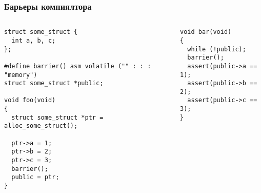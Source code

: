 \begin{frame}[fragile]
\frametitle{Барьеры компиялтора}

\begin{columns}[T]
  \begin{column}{.45\linewidth}
    \begin{lstlisting}
struct some_struct {
  int a, b, c;
};

#define barrier() asm volatile ("" : : : "memory")
struct some_struct *public;

void foo(void)
{
  struct some_struct *ptr = alloc_some_struct();

  ptr->a = 1;
  ptr->b = 2;
  ptr->c = 3;
  barrier();
  public = ptr;
}
    \end{lstlisting}
  \end{column}
  \begin{column}{.45\linewidth}
    \begin{lstlisting}
void bar(void)
{
  while (!public);
  barrier();
  assert(public->a == 1);
  assert(public->b == 2);
  assert(public->c == 3);
}
    \end{lstlisting}
  \end{column}
\end{columns}
\end{frame}


